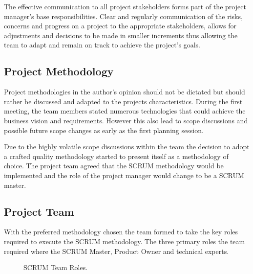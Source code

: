 \documentclass[12pt]{witseiepaper}
\begin{document}
The effective communication to all project stakeholders forms part of the project manager’s base responsibilities. Clear and regularly communication of the risks, concerns and progress on a project to the appropriate stakeholders, allows for adjustments and decisions to be made in smaller increments thus allowing the team to adapt and remain on track to achieve the project’s goals.

\subsection{Project Methodology}

Project methodologies in the author's opinion should not be dictated but should rather be discussed and adapted to the projects characteristics. During the first meeting, the team members stated numerous technologies that could achieve the business vision and requirements. However this also lead to scope discussions and possible future scope changes as early as the first planning session.

Due to the highly volatile scope discussions within the team the decision to adopt a crafted quality methodology \cite{craft} started to present itself as a methodology of choice. The project team agreed that the SCRUM methodology \cite{ExpertJudgement} would be implemented and the role of the project manager would change to be a SCRUM master. \cite{SCUMMaster}

\subsection{Project Team}

With the preferred methodology chosen the team formed to take the key roles required to execute the SCRUM methodology. The three primary roles the team required where the SCRUM Master, Product Owner and technical experts.\\

\begin{figure}[H]
	\caption{SCRUM Team Roles.} 
	\label{fig:SCRUMTeam}
\end{figure}
\end{document}

